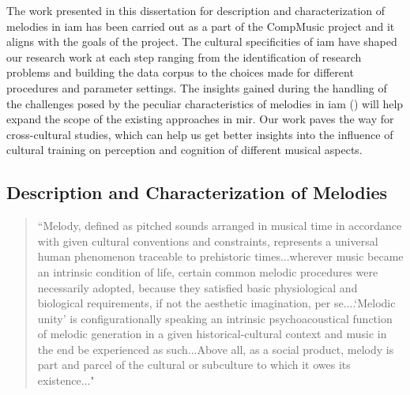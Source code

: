 The work presented in this dissertation for description and characterization of melodies in \gls{iam} has been carried out as a part of the CompMusic project and it aligns with the goals of the project. The cultural specificities of \gls{iam} have shaped our research work at each step ranging from the identification of research problems and building the data corpus to the choices made for different procedures and parameter settings. The insights gained during the handling of the challenges posed by the peculiar characteristics of melodies in \gls{iam} () will help expand the scope of the existing approaches in \gls{mir}. Our work paves the way for cross-cultural studies, which can help us get better insights into the influence of cultural training on perception and cognition of different musical aspects.



\subsection{Description and Characterization of Melodies}
\label{sec:intro_description_characterization_melodies}

\blockquote[{\cite{ringer2001melody}}]{``Melody, defined as pitched sounds arranged in musical time in accordance with given cultural conventions and constraints, represents a universal human phenomenon traceable to prehistoric times...wherever music became an intrinsic condition of life, certain common melodic procedures were necessarily adopted, because they satisfied basic physiological and biological requirements, if not the aesthetic imagination, per se....`Melodic unity' is configurationally speaking an intrinsic psychoacoustical function of melodic generation in a given historical-cultural context and music in the end be experienced as such...Above all, as a social product, melody is part and parcel of the cultural or subculture to which it owes its existence..."}

